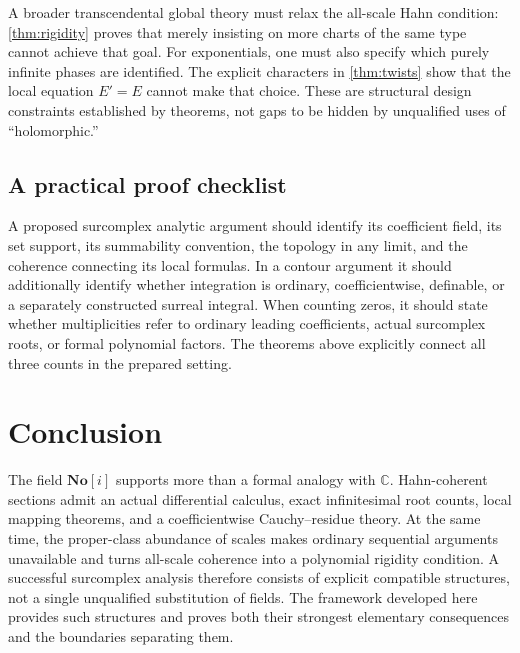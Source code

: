 \documentclass[11pt,oneside]{article}
\numberwithin{equation}{section}
\theoremstyle{definition}
\theoremstyle{remark}\newtheorem{remark}[theorem]{Remark}
\newcommand{\No}{\mathbf{No}}
\newcommand{\C}{\mathbb C}
\begin{document}
A broader transcendental global theory must relax the all-scale Hahn
condition: \cref{thm:rigidity} proves that merely insisting on more charts
of the same type cannot achieve that goal. For exponentials, one must
also specify which purely infinite phases are identified. The explicit
characters in \cref{thm:twists} show that the local equation $E'=E$ cannot
make that choice. These are structural design constraints established by
theorems, not gaps to be hidden by unqualified uses of ``holomorphic.''

\subsection{A practical proof checklist}
A proposed surcomplex analytic argument should identify its coefficient
field, its set support, its summability convention, the topology in any
limit, and the coherence connecting its local formulas. In a contour
argument it should additionally identify whether integration is ordinary,
coefficientwise, definable, or a separately constructed surreal integral.
When counting zeros, it should state whether multiplicities refer to
ordinary leading coefficients, actual surcomplex roots, or formal
polynomial factors. The theorems above explicitly connect all three
counts in the prepared setting.

\section*{Conclusion}
The field $\No[i]$ supports more than a formal analogy with $\C$.
Hahn-coherent sections admit an actual differential calculus, exact
infinitesimal root counts, local mapping theorems, and a coefficientwise
Cauchy--residue theory. At the same time, the proper-class abundance of
scales makes ordinary sequential arguments unavailable and turns
all-scale coherence into a polynomial rigidity condition. A successful
surcomplex analysis therefore consists of explicit compatible structures,
not a single unqualified substitution of fields. The framework developed
here provides such structures and proves both their strongest elementary
consequences and the boundaries separating them.

\appendix
\end{document}
